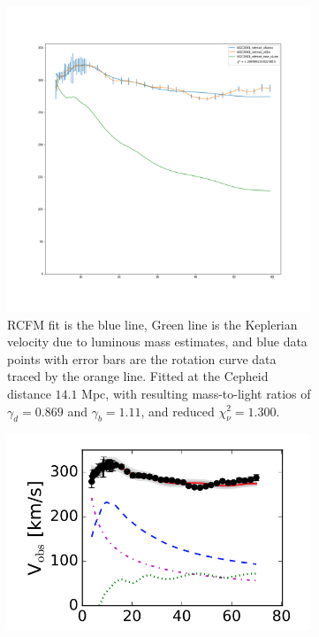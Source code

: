 \documentclass[reprint,%
 amsmath,amssymb,
 aps,
]{revtex4-1}
\begin{document}
 \begin{figure}[ht] 
  \begin{subfigure}[b]{0.5\linewidth}
    \centering
    \includegraphics[width=0.95\linewidth]{figures/NGC2841_rotmod_XueSofue.png} 
    \caption{  RCFM fit is the blue line,  Green line is the Keplerian velocity due to  luminous mass estimates, and blue data points with error bars are the rotation curve data traced by the orange line.
  Fitted at the 
      Cepheid distance $14.1$ Mpc, with resulting mass-to-light ratios of  $\gamma_d =0.869 $    and $\gamma_b =1.11$, and  reduced  $\chi^2_\nu = 1.300$.  } 
    \label{fig:ngc2841RCFMfit} 
    \vspace{4ex}
  \end{subfigure}%
  \begin{subfigure}[b]{0.5\linewidth}
    \centering
    \includegraphics[width=0.95\linewidth]{figures/NGC2841_RarResults_Li2018}

\end{subfigure}
\end{figure}
\end{document}
